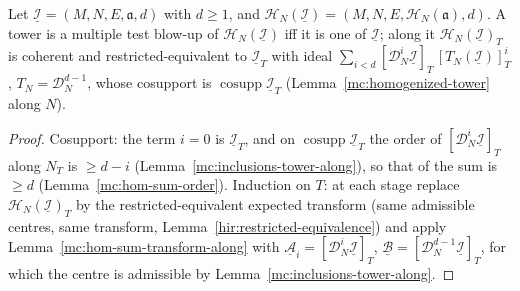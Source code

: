 \begin{lemma}
\label{mc:homogenized-tower-along}
\leanok
Let \(\underline{\mathcal I}=(M,N,E,\mathfrak a,d)\) with \(d\ge1\), and \(\mathcal H_N(\underline{\mathcal I})=(M,N,E,\mathcal H_N(\mathfrak a),d)\). A tower is a multiple test blow-up of
\(\mathcal H_N(\underline{\mathcal I})\) iff it is one of \(\underline{\mathcal I}\); along it \(\mathcal H_N(\underline{\mathcal I})_T\) is coherent and restricted-equivalent to
\(\underline{\mathcal I}_T\) with ideal \(\sum_{i<d}[\mathcal D_N^i\underline{\mathcal I}]_T\,[T_N(\underline{\mathcal I})]_T^i\), \(T_N=\mathcal D_N^{d-1}\), whose cosupport is
\(\operatorname{cosupp}\underline{\mathcal I}_T\) (Lemma~\ref{mc:homogenized-tower} along \(N\)).
\end{lemma}
\begin{proof}
\leanok
Cosupport: the term \(i=0\) is \(\underline{\mathcal I}_T\), and on \(\operatorname{cosupp}\underline{\mathcal I}_T\) the order of \([\mathcal D_N^i\underline{\mathcal I}]_T\) along \(N_T\) is
\(\ge d-i\) (Lemma~\ref{mc:inclusions-tower-along}), so that of the sum is \(\ge d\) (Lemma~\ref{mc:hom-sum-order}). Induction on \(T\): at each stage replace
\(\mathcal H_N(\underline{\mathcal I})_T\) by the restricted-equivalent expected transform (same admissible centres, same transform, Lemma~\ref{hir:restricted-equivalence}) and apply
Lemma~\ref{mc:hom-sum-transform-along} with \(\underline{\mathcal A}_i=[\mathcal D_N^i\underline{\mathcal I}]_T\), \(\underline{\mathcal B}=[\mathcal D_N^{d-1}\underline{\mathcal I}]_T\), for
which the centre is admissible by Lemma~\ref{mc:inclusions-tower-along}.
\end{proof}


